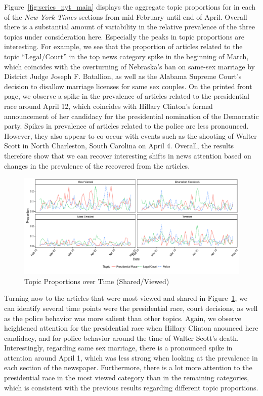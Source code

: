 \documentclass[12pt]{article}
\begin{document}
\begin{doublespace}
Figure~\ref{fig:series_nyt_main} displays the aggregate topic proportions for in each of the \textit{New York Times} sections from mid February until end of April. Overall there is a substantial amount of variability in the relative prevalence of the three topics under consideration here. Especially the peaks in topic proportions are interesting. For example, we see that the proportion of articles related to the topic ``Legal/Court'' in the top news category spike in the beginning of March, which coincides with the overturning of Nebraska's ban on same-sex marriage by District Judge Joseph F. Batallion, as well as the Alabama Supreme Court's decision to disallow marriage licenses for same sex couples. On the printed front page, we observe a spike in the prevalence of articles related to the presidential race around April 12, which coincides with Hillary Clinton's formal announcement of her candidacy for the presidential nomination of the Democratic party. Spikes in prevalence of articles related to the police are less pronounced. However, they also appear to co-occur with events such as the shooting of Walter Scott in North Charleston, South Carolina on April 4. Overall, the results therefore show that we can recover interesting shifts in news attention based on changes in the prevalence of the recovered from the articles.

\begin{figure}
\caption{Topic Proportions over Time (Shared/Viewed)}\label{fig:series_share_main}
\includegraphics[width=\textwidth]{../calc/fig/series_share_main} 
\end{figure}

Turning now to the articles that were most viewed and shared in Figure~\ref{fig:series_share_main}, we can identify several time points were the presidential race, court decisions, as well as the police behavior was more salient than other topics. Again, we observe heightened attention for the presidential race when Hillary Clinton anounced here candidacy, and for police behavior around the time of Walter Scott's death. Interestingly, regarding same sex marriage, there is a pronounced spike in attention around April 1, which was less strong when looking at the prevalence in each section of the newspaper. Furthermore, there is a lot more attention to the presidential race in the most viewed category than in the remaining categories, which is consistent with the previous results regarding different topic proportions.



\end{doublespace}
\end{document}
